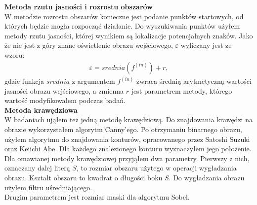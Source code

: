 \textbf{Metoda rzutu jasności i rozrostu obszarów}\\
W metodzie rozrostu obszarów konieczne jest podanie punktów startowych, od których będzie mogła rozpocząć działanie. Do wyszukiwania punktów użyłem metody rzutu jasności, której wynikiem są lokalizacje potencjalnych znaków. Jako że nie jest z góry znane oświetlenie obrazu wejściowego, $\varepsilon$ wyliczany jest ze wzoru:
\begin{gather*}
  \varepsilon = srednia(f^{(in)}) + r,
\end{gather*}
gdzie funkcja $srednia$ z argumentem $f^{(in)}$ zwraca średnią arytmetyczną wartości jasności obrazu wejściowego, a zmienna $r$ jest parametrem metody, którego wartość modyfikowałem podczas badań. \\

\textbf{Metoda krawędziowa}\\
W badaniach ująłem też jedną metodę krawędziową. Do znajdowania krawędzi na obrazie wykorzystałem algorytm Canny'ego. Po otrzymaniu binarnego obrazu, użyłem algorytmu do znajdowania konturów, opracowanego przez Satoshi Suzuki oraz Keiichi Abe. Dla każdego znalezionego konturu wyznaczyłem jego położenie.\\
Dla omawianej metody krawędziowej przyjąłem dwa parametry. Pierwszy z nich, oznaczany dalej literą $S$, to rozmiar obszaru użytego w operacji wygładzania obrazu. Kształt obszaru to kwadrat o długości boku $S$. Do wygładzania obrazu użyłem filtru uśredniającego. \\
Drugim parametrem jest rozmiar maski dla algorytmu Sobel.

